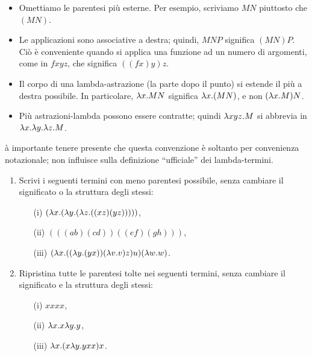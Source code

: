 \documentclass{article}
\begin{document}
\begin{convention}
  \begin{itemize}
  \item Omettiamo le parentesi pi\`u esterne. Per esempio, scriviamo $MN$
    piuttosto che $(MN)$.
  \item Le applicazioni sono associative a destra; quindi, $MNP$ significa
    $(MN)P$. Ci\`o \`e conveniente quando si applica una funzione ad un
    numero di argomenti, come in $fxyz$, che significa $((fx)y)z$. 
  \item Il corpo di una lambda-astrazione (la parte dopo il punto)
  si estende il pi\`u a destra possibile. In particolare, $\lambda
    x.MN$ significa $\lambda x.(MN)$, e non $(\lambda x.M)N$. 
  \item Pi\`u astrazioni-lambda possono essere contratte; quindi $\lambda
    xyz.M$ si abbrevia in $\lambda x.\lambda y.\lambda z.M$.
  \end{itemize}
\end{convention}  

\`a importante tenere presente che questa convenzione \`e soltanto 
per convenienza notazionale; non influisce sulla definizione 
``ufficiale'' dei lambda-termini.

\begin{exercise}
  \begin{enumerate}\alphalabels
  \item Scrivi i seguenti termini con meno parentesi possibile,
  senza cambiare il significato o la struttura degli stessi:
    \begin{enumerate}
    \item[(i)] $(\lambda x.(\lambda y.(\lambda z.((xz)(yz)))))$, 
    \item[(ii)] $(((ab)(cd))((ef)(gh)))$, 
    \item[(iii)] $(\lambda x.((\lambda y.(yx))(\lambda v.v)z)u)(\lambda w.w)$.
    \end{enumerate}
  \item Ripristina tutte le parentesi tolte nei seguenti termini,
  senza cambiare il significato e la struttura degli stessi:
    \begin{enumerate}
    \item[(i)] $xxxx$, 
    \item[(ii)] $\lambda x.x\lambda y.y$, 
    \item[(iii)] $\lambda x.(x\lambda y.yxx)x$.
    \end{enumerate}
  \end{enumerate}
\end{exercise}
\end{document}
